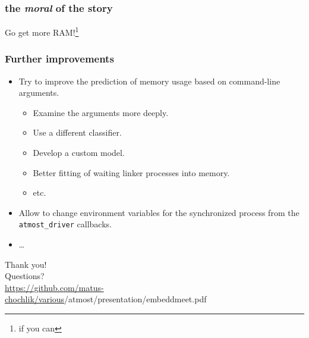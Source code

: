 \documentclass[compress,table,xcolor=table]{beamer}
\newcommand{\shelltext}[1]{\texttt{\colorbox{light-gray}{#1}}}
\begin{document}
\begin{frame}
  \frametitle{the {\em \LARGE moral} of the story}
  \centering
  \Huge
	Go get more RAM!\footnote{if you can}
\end{frame}
\begin{frame}
  \frametitle{Further improvements}
  \begin{itemize}
    \Large
    \item Try to improve the prediction of memory usage based on command-line
      arguments.
    \begin{itemize}
      \large
      \item Examine the arguments more deeply.
      \item Use a different classifier.
      \item Develop a custom model.
      \item Better fitting of waiting linker processes into memory.
      \item etc.
    \end{itemize}
    \item Allow to change environment variables for the synchronized process
      from the \shelltext{atmost\_driver} callbacks.
    \item \ldots
  \end{itemize}
\end{frame}
\begin{frame}
  \centering
  \Huge
  Thank you!\\Questions?\\
  \vfill
  \Large
  \url{https://github.com/matus-chochlik/various}/atmost/presentation/embeddmeet.pdf
\end{frame}
\end{document}
